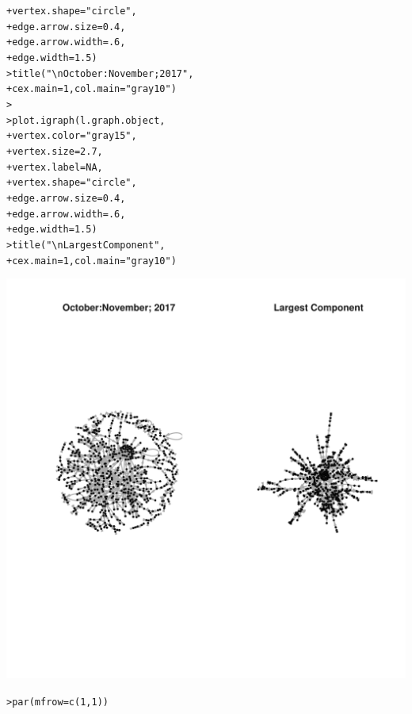 \documentclass[12pt]{article}\usepackage[]{graphicx}\usepackage[]{color}
\makeatletter
\newcommand{\hlnum}[1]{\textcolor[rgb]{0.82,0.78,0.62}{#1}}%
\newcommand{\hlstr}[1]{\textcolor[rgb]{0.82,0.78,0.62}{#1}}%
\newcommand{\hlstd}[1]{\textcolor[rgb]{0.882,0.878,0.898}{#1}}%
\newcommand{\hlkwc}[1]{\textcolor[rgb]{0.812,0.522,0.388}{#1}}%
\newcommand{\hlkwd}[1]{\textcolor[rgb]{0.733,0.388,0.812}{#1}}%
\newenvironment{kframe}{%
 \def\at@end@of@kframe{}%
 \ifinner\ifhmode%
  \def\at@end@of@kframe{\end{minipage}}%
  \begin{minipage}{\columnwidth}%
 \fi\fi%
 \def\FrameCommand##1{\hskip\@totalleftmargin \hskip-\fboxsep
 \colorbox{shadecolor}{##1}\hskip-\fboxsep
     \hskip-\linewidth \hskip-\@totalleftmargin \hskip\columnwidth}%
 \MakeFramed {\advance\hsize-\width
   \@totalleftmargin\z@ \linewidth\hsize
   \@setminipage}}%
 {\par\unskip\endMakeFramed%
 \at@end@of@kframe}
\newenvironment{knitrout}{}{} %
\makeatother
\begin{document}
\begin{flushleft}
\begin{center}
\begin{knitrout}
\begin{kframe}
\begin{alltt}
\hlstd{+ }            \hlkwc{vertex.shape}\hlstd{=}\hlstr{"circle"}\hlstd{,}
\hlstd{+ }            \hlkwc{edge.arrow.size}\hlstd{=}\hlnum{0.4}\hlstd{,}
\hlstd{+ }            \hlkwc{edge.arrow.width}\hlstd{=}\hlnum{.6}\hlstd{,}
\hlstd{+ }            \hlkwc{edge.width}\hlstd{=}\hlnum{1.5}\hlstd{)}
\hlstd{> }\hlkwd{title}\hlstd{(}\hlstr{"\textbackslash{}n October:November; 2017"}\hlstd{,}
\hlstd{+ }      \hlkwc{cex.main}\hlstd{=}\hlnum{1}\hlstd{,} \hlkwc{col.main}\hlstd{=}\hlstr{"gray10"}\hlstd{)}
\hlstd{> }
\hlstd{> }\hlkwd{plot.igraph}\hlstd{(l.graph.object,}
\hlstd{+ }            \hlkwc{vertex.color}\hlstd{=}\hlstr{"gray15"}\hlstd{,}
\hlstd{+ }            \hlkwc{vertex.size}\hlstd{=}\hlnum{2.7}\hlstd{,}
\hlstd{+ }            \hlkwc{vertex.label}\hlstd{=}\hlnum{NA}\hlstd{,}
\hlstd{+ }            \hlkwc{vertex.shape}\hlstd{=}\hlstr{"circle"}\hlstd{,}
\hlstd{+ }            \hlkwc{edge.arrow.size}\hlstd{=}\hlnum{0.4}\hlstd{,}
\hlstd{+ }            \hlkwc{edge.arrow.width}\hlstd{=}\hlnum{.6}\hlstd{,}
\hlstd{+ }            \hlkwc{edge.width}\hlstd{=}\hlnum{1.5}\hlstd{)}
\hlstd{> }\hlkwd{title}\hlstd{(}\hlstr{"\textbackslash{}n Largest Component"}\hlstd{,}
\hlstd{+ }      \hlkwc{cex.main}\hlstd{=}\hlnum{1}\hlstd{,} \hlkwc{col.main}\hlstd{=}\hlstr{"gray10"}\hlstd{)}
\end{alltt}
\end{kframe}
\includegraphics[width=6in]{figure/starting-1} 
\begin{kframe}\begin{alltt}
\hlstd{> }\hlkwd{par}\hlstd{(}\hlkwc{mfrow}\hlstd{=}\hlkwd{c}\hlstd{(}\hlnum{1}\hlstd{,}\hlnum{1}\hlstd{))}
\end{alltt}
\end{kframe}
\end{knitrout}
\end{center}


\end{flushleft}
\end{document}
